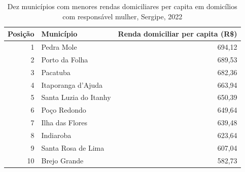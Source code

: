 \begin{table}[htbp]
\centering
\caption{Dez municípios com menores rendas domiciliares per capita em domicílios com responsável mulher, Sergipe, 2022}
\label{tab:item2-3-menor-rdpc-mulher}
\small
\begin{tabular}{rlr}
\toprule
Posição & Município & Renda domiciliar per capita (R\$) \\
\midrule
1 & Pedra Mole & 694,12 \\
2 & Porto da Folha & 689,53 \\
3 & Pacatuba & 682,36 \\
4 & Itaporanga d'Ajuda & 663,94 \\
5 & Santa Luzia do Itanhy & 650,39 \\
6 & Poço Redondo & 649,64 \\
7 & Ilha das Flores & 639,48 \\
8 & Indiaroba & 623,64 \\
9 & Santa Rosa de Lima & 607,04 \\
10 & Brejo Grande & 582,73 \\
\bottomrule
\end{tabular}
\end{table}
